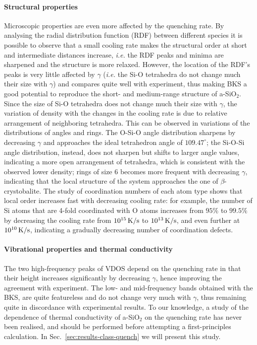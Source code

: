 \paragraph{Structural properties}
Microscopic properties are even more affected by the quenching rate. 
By analysing the radial distribution function (RDF) between different species it is possible to observe that a small cooling rate makes the structural order at short and intermediate distances increase, \emph{i.e.} the RDF peaks and minima are sharpened and the structure is more relaxed. However, the location of the RDF's peaks is very little affected by $\gamma$ (\emph{i.e.} the Si-O tetrahedra do not change much their size with $\gamma$) and compares quite well with experiment, thus making BKS a good potential to reproduce the short- and medium-range structure of a-SiO$_2$. 
Since the size of Si-O tetrahedra does not change much their size with $\gamma$, the variation of density with the changes in the cooling rate is due to relative arrangement of neighboring tetrahedra. 
This can be observed in variations of the distributions of angles and rings. The O-Si-O angle distribution sharpens by decreasing $\gamma$ and approaches the ideal tetrahedron angle of $109.47^\circ$; the Si-O-Si angle distribution, instead, does not sharpen but shifts to larger angle values, indicating a more open arrangement of tetrahedra, which is consistent with the observed lower density; rings of size $6$ becomes more frequent with decreasing $\gamma$, indicating that the local structure of the system approaches the one of $\beta$-crystobalite. 
The study of coordination numbers of each atom type shows that local order increases fast with decreasing cooling rate: for example, the number of Si atoms that are 4-fold coordinated with O atoms increases from $95\%$ to $99.5\%$ by decreasing the cooling rate from $10^{15}\,\mathrm{K/s}$ to $10^{13}\,\mathrm{K/s}$, and even further at $10^{10}\,\mathrm{K/s}$, indicating a gradually decreasing number of coordination defects. 

\paragraph{Vibrational properties and thermal conductivity}
The two high-frequency peaks of VDOS depend on the quenching rate in that their height increases significantly by decreasing $\gamma$, hence improving the agreement with experiment. 
The low- and mid-frequency bands obtained with the BKS, are quite featureless and do not change very much with $\gamma$, thus remaining quite in discordance with experimental results. 
To our knowledge, a study of the dependence of thermal conductivity of a-SiO$_2$ on the quenching rate has never been realised, and should be performed before attempting a first-principles calculation. In Sec.~\ref{sec:results-class-quench} we will present this study. 

